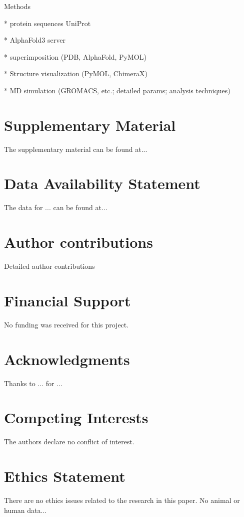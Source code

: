 \documentclass[fleqn,10pt,lineno]{manuscript}
\begin{document}
Methods

* protein sequences UniProt

* AlphaFold3 server

* superimposition (PDB, AlphaFold, PyMOL)

* Structure visualization (PyMOL, ChimeraX)

* MD simulation (GROMACS, etc.; detailed params; analysis techniques)


\section*{Supplementary Material}

The supplementary material can be found at...


\section*{Data Availability Statement} 

The data for ... can be found at...


\section*{Author contributions}

Detailed author contributions


\section*{Financial Support}

No funding was received for this project. 


\section*{Acknowledgments}

Thanks to ... for ...


\section*{Competing Interests}

The authors declare no conflict of interest.


\section*{Ethics Statement}

There are no ethics issues related to the research in this paper. No animal or human data...
\end{document}
